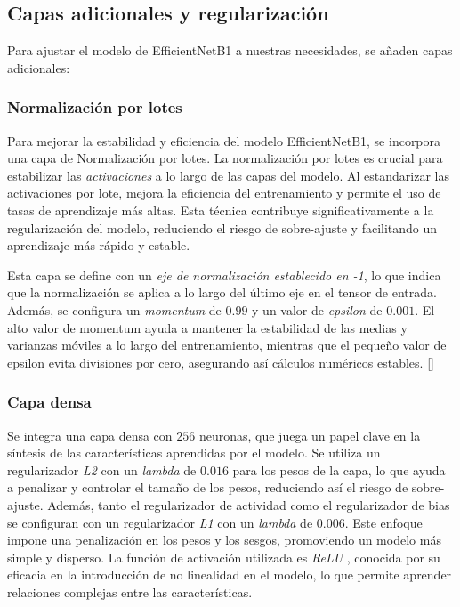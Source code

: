 \subsection{Capas adicionales y regularización}

Para ajustar el modelo de EfficientNetB1 a nuestras necesidades, se añaden capas adicionales:

\subsubsection{Normalización por lotes}

Para mejorar la estabilidad y eficiencia del modelo EfficientNetB1, se incorpora una capa de Normalización por lotes. La normalización por lotes es crucial para estabilizar las \textit{activaciones} a lo largo de las capas del modelo. Al estandarizar las activaciones por lote, mejora la eficiencia del entrenamiento y permite el uso de tasas de aprendizaje más altas. Esta técnica contribuye significativamente a la regularización del modelo, reduciendo el riesgo de sobre-ajuste y facilitando un aprendizaje más rápido y estable.

Esta capa se define con un \textit{eje de normalización establecido en -1}, lo que indica que la normalización se aplica a lo largo del último eje en el tensor de entrada. Además, se configura un \textit{momentum} de $0.99$ y un valor de \textit{epsilon} de $0.001$. El alto valor de momentum ayuda a mantener la estabilidad de las medias y varianzas móviles a lo largo del entrenamiento, mientras que el pequeño valor de epsilon evita divisiones por cero, asegurando así cálculos numéricos estables. []

\subsubsection{Capa densa}

Se integra una capa densa con $256$ neuronas, que juega un papel clave en la síntesis de las características aprendidas por el modelo. Se utiliza un regularizador \textit{L2} con un \textit{lambda} de $0.016$ para los pesos de la capa, lo que ayuda a penalizar y controlar el tamaño de los pesos, reduciendo así el riesgo de sobre-ajuste. Además, tanto el regularizador de actividad como el regularizador de bias se configuran con un regularizador \textit{L1} con un \textit{lambda} de $0.006$. Este enfoque impone una penalización en los pesos y los sesgos, promoviendo un modelo más simple y disperso. La función de activación utilizada es \textit{ReLU} , conocida por su eficacia en la introducción de no linealidad en el modelo, lo que permite aprender relaciones complejas entre las características. 

